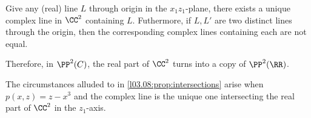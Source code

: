 \begin{prop}
	Give any (real) line $L$ through origin in the $x_1z_1$-plane, there exists a unique complex line in $\CC^2$ containing $L$. Futhermore, if $L, L'$ are two distinct lines through the origin, then the corresponding complex lines containing each are not equal.
\end{prop}

Therefore, in $\PP^2(C)$, the real part of $\CC^2$ turns into a copy of  $\PP^2(\RR)$.

The circumstances alluded to in \cref{l03.08:prop:intersections} arise when $p(x, z) = z - x^3$ and the complex line is the unique one intersecting the real part of  $\CC^2$ in the $z_1$-axis.

